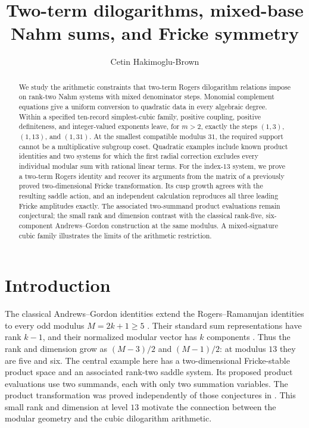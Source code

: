 \documentclass[11pt,reqno]{amsart}
\title[Two-term dilogarithms and modular products]{Two-term dilogarithms, mixed-base Nahm sums, and Fricke symmetry}
\author{Cetin Hakimoglu-Brown}
\date{}
\theoremstyle{remark}
\numberwithin{equation}{section}
\begin{document}
\begin{abstract}
We study the arithmetic constraints that two-term Rogers dilogarithm
relations impose on rank-two Nahm systems with mixed denominator steps.
Monomial complement equations give a uniform conversion to quadratic
data in every algebraic degree. Within a specified ten-record
simplest-cubic family, positive coupling, positive definiteness, and
integer-valued exponents leave, for $m>2$, exactly the steps $(1,3)$,
$(1,13)$, and $(1,31)$. At the smallest compatible modulus $31$, the
required support cannot be a multiplicative subgroup coset. Quadratic
examples include known product identities and two systems for which
the first radial correction excludes every individual modular sum with
rational linear terms. For the index-$13$ system, we prove a two-term
Rogers identity and recover its arguments from the matrix of a
previously proved two-dimensional Fricke transformation. Its cusp
growth agrees with the resulting saddle action, and an independent
calculation reproduces all three leading Fricke amplitudes exactly. The associated
two-summand product evaluations remain conjectural; the small rank and
dimension contrast with the classical rank-five, six-component
Andrews--Gordon construction at the same modulus.  A mixed-signature cubic family illustrates the limits
of the arithmetic restriction.
\end{abstract}
\maketitle

\section{Introduction}\label{sec:intro}
The classical Andrews--Gordon identities extend the Rogers--Ramanujan
identities to every odd modulus $M=2k+1\geq5$ \cite{Andrews}. Their standard
sum representations have rank $k-1$, and their normalized modular vector
has $k$ components \cite[Section~1.3]{Ono}. Thus the rank and dimension
grow as $(M-3)/2$ and $(M-1)/2$: at modulus $13$ they are five and six.
The central example here has a two-dimensional Fricke-stable product
space and an associated rank-two saddle system. Its proposed product
evaluations use two summands, each with only two summation variables.
The product transformation was proved independently of those conjectures
in \cite{FrickeCompanion}.
This small rank and dimension at level $13$ motivate the connection
between the modular geometry and the cubic dilogarithm arithmetic.
\end{document}
